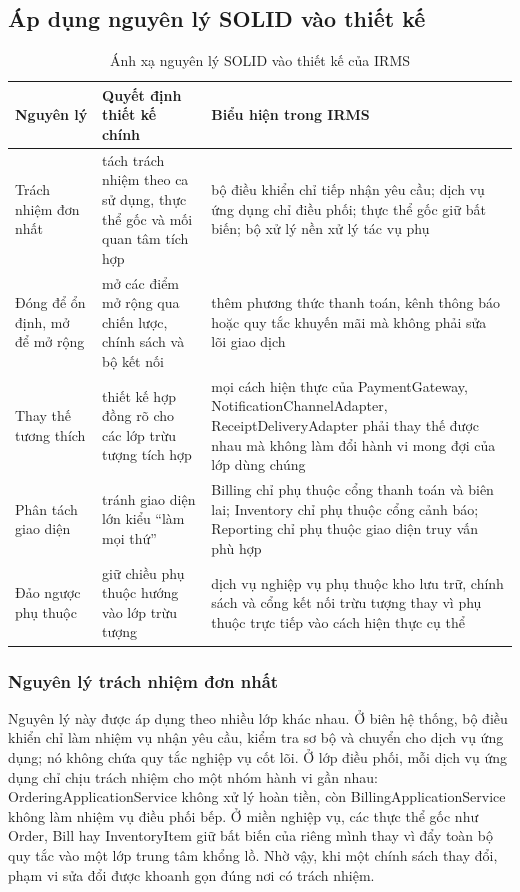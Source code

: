 \documentclass[11pt,a4paper]{article}
\begin{document}
\subsection{Áp dụng nguyên lý SOLID vào thiết kế}

\begin{table}[H]
\centering
\caption{Ánh xạ nguyên lý SOLID vào thiết kế của IRMS}
\begin{tabularx}{\textwidth}{|p{3.2cm}|p{4.5cm}|X|}
\hline
\textbf{Nguyên lý} & \textbf{Quyết định thiết kế chính} & \textbf{Biểu hiện trong IRMS} \\
\hline
Trách nhiệm đơn nhất & tách trách nhiệm theo ca sử dụng, thực thể gốc và mối quan tâm tích hợp & bộ điều khiển chỉ tiếp nhận yêu cầu; dịch vụ ứng dụng chỉ điều phối; thực thể gốc giữ bất biến; bộ xử lý nền xử lý tác vụ phụ \\
\hline
Đóng để ổn định, mở để mở rộng & mở các điểm mở rộng qua chiến lược, chính sách và bộ kết nối & thêm phương thức thanh toán, kênh thông báo hoặc quy tắc khuyến mãi mà không phải sửa lõi giao dịch \\
\hline
Thay thế tương thích & thiết kế hợp đồng rõ cho các lớp trừu tượng tích hợp & mọi cách hiện thực của \textsf{PaymentGateway}, \textsf{NotificationChannelAdapter}, \textsf{ReceiptDeliveryAdapter} phải thay thế được nhau mà không làm đổi hành vi mong đợi của lớp dùng chúng \\
\hline
Phân tách giao diện & tránh giao diện lớn kiểu \enquote{làm mọi thứ} & \textsf{Billing} chỉ phụ thuộc cổng thanh toán và biên lai; \textsf{Inventory} chỉ phụ thuộc cổng cảnh báo; \textsf{Reporting} chỉ phụ thuộc giao diện truy vấn phù hợp \\
\hline
Đảo ngược phụ thuộc & giữ chiều phụ thuộc hướng vào lớp trừu tượng & dịch vụ nghiệp vụ phụ thuộc kho lưu trữ, chính sách và cổng kết nối trừu tượng thay vì phụ thuộc trực tiếp vào cách hiện thực cụ thể \\
\hline
\end{tabularx}
\end{table}

\subsubsection{Nguyên lý trách nhiệm đơn nhất}
Nguyên lý này được áp dụng theo nhiều lớp khác nhau. Ở biên hệ thống, bộ điều khiển chỉ làm nhiệm vụ nhận yêu cầu, kiểm tra sơ bộ và chuyển cho dịch vụ ứng dụng; nó không chứa quy tắc nghiệp vụ cốt lõi. Ở lớp điều phối, mỗi dịch vụ ứng dụng chỉ chịu trách nhiệm cho một nhóm hành vi gần nhau: \textsf{OrderingApplicationService} không xử lý hoàn tiền, còn \textsf{BillingApplicationService} không làm nhiệm vụ điều phối bếp. Ở miền nghiệp vụ, các thực thể gốc như \textsf{Order}, \textsf{Bill} hay \textsf{InventoryItem} giữ bất biến của riêng mình thay vì đẩy toàn bộ quy tắc vào một lớp trung tâm khổng lồ. Nhờ vậy, khi một chính sách thay đổi, phạm vi sửa đổi được khoanh gọn đúng nơi có trách nhiệm.
\end{document}
